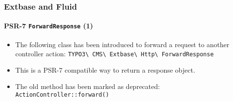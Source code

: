 %

\begin{frame}[fragile]
	\frametitle{Extbase and Fluid}
	\framesubtitle{PSR-7 \texttt{ForwardResponse} (1)}

	\begin{itemize}
		\item The following class has been introduced to forward a request to
			another controller action:
			\smaller\texttt{TYPO3\textbackslash
				CMS\textbackslash
				Extbase\textbackslash
				Http\textbackslash
				ForwardResponse}\normalsize
		\item This is a PSR-7 compatible way to return a response object.
		\item The old method has been marked as deprecated:\newline
			\smaller\texttt{ActionController::forward()}\normalsize

	\end{itemize}

\end{frame}

